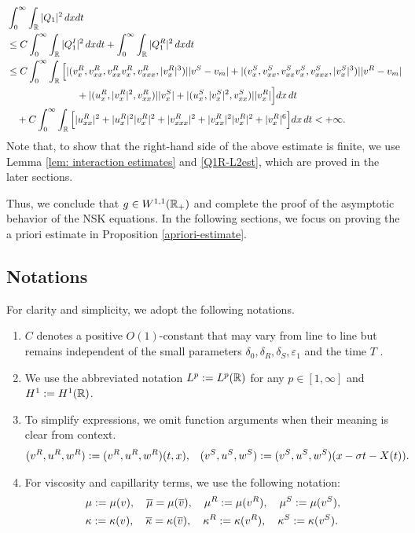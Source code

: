 \documentclass[11pt,reqno]{amsart}
\begin{document}
\begin{align*}
    &\int_0^\infty \int_\mathbb{R} |Q_1|^2 \, dxdt \\
    &\le C \int_0^\infty \int_\mathbb{R} |Q_1^I|^2 \, dxdt + \int_0^\infty \int_\mathbb{R} |Q_1^R|^2 \, dxdt\\ 
    &\le C \int_0^\infty \int_\mathbb{R}\Big[ |(v^R_x,v^R_{xx},v^R_{xx}v^R_x,v^R_{xxx},|v^R_x|^3)| |v^S-v_m| + |(v^S_x,v^S_{xx},v^S_{xx}v^S_x,v^S_{xxx},|v^S_x|^3)| | v^R-v_m|  \\
    &\hspace{2.5cm} +|( u^R_x,|v^R_x|^2,v^R_{xx})| |v^S_x|+|(u^S_x, |v^S_x|^2,v^S_{xx})| |v^R_x|\Big] dx\,dt \\
    &\quad + C \int_0^\infty \int_\mathbb{R} \Big[ |u^R_{xx}|^2+|u^R_x|^2|v^R_x|^2+|v^R_{xxx}|^2+|v^R_{xx}|^2|v^R_x|^2 +|v^R_x|^6 \Big] dx\,dt< +\infty.
\end{align*}
Note that, to show that the right-hand side of the above estimate is finite, we use Lemma \ref{lem: interaction estimates} and \eqref{Q1R-L2est}, which are proved in the later sections.

Thus, we conclude that $g\in W^{1,1}(\mathbb{R}_+)$ and complete the proof of the asymptotic behavior of the NSK equations. In the following sections, we focus on proving the a priori estimate in Proposition \ref{apriori-estimate}.

\subsection{Notations}  For clarity and simplicity, we adopt the following notations.
\begin{enumerate} 
    \item $C$ denotes a positive $O(1)$-constant that may vary from line to line but remains independent of the small parameters $\delta_0,\delta_R,\delta_S, \varepsilon_1$ and the time $T$ .
    \item We use the abbreviated notation $L^p:=L^p(\mathbb{R})$ for any $p\in[1,\infty]$ and $H^1:=H^1(\mathbb{R})$.
    \item To simplify expressions, we omit function arguments when their meaning is clear from context. 
     \begin{align*}
          &(v^R,u^R,w^R) := (v^R,u^R,w^R)(t,x),  &
          &(v^S,u^S,w^S) := (v^S,u^S,w^S)(x-\sigma t - X(t) ).
     \end{align*}
     \item For viscosity and capillarity terms, we use the following notation:
     \begin{align*}
         &\mu:=\mu(v), \quad \overline{\mu}=\mu(\overline{v}), \quad \mu^R:=\mu(v^R), \quad \mu^S:=\mu(v^S),\\
         &\kappa:=\kappa(v), \quad \overline{\kappa}=\kappa(\overline{v}), \quad \kappa^R:=\kappa(v^R), \quad \kappa^S:=\kappa(v^S).
     \end{align*}
     
\end{enumerate}
   
\end{document}

